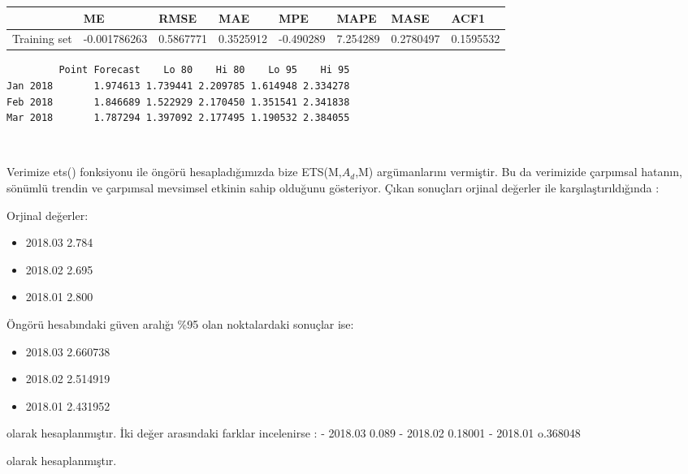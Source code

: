 \documentclass[11pt]{article}
\providecommand{\tightlist}{%
      \setlength{\itemsep}{0pt}\setlength{\parskip}{0pt}}
\begin{document}
    \begin{tabular}{r|lllllll}
  & ME & RMSE & MAE & MPE & MAPE & MASE & ACF1\\
\hline
	Training set & -0.001786263 & 0.5867771    & 0.3525912    & -0.490289    & 7.254289     & 0.2780497    & 0.1595532   \\
\end{tabular}


    
    
    \begin{verbatim}
         Point Forecast    Lo 80    Hi 80    Lo 95    Hi 95
Jan 2018       1.974613 1.739441 2.209785 1.614948 2.334278
Feb 2018       1.846689 1.522929 2.170450 1.351541 2.341838
Mar 2018       1.787294 1.397092 2.177495 1.190532 2.384055
    \end{verbatim}

    
    \begin{center}
    \end{center}
    { \hspace*{\fill} \\}
    
    Verimize ets() fonksiyonu ile öngörü hesapladığımızda bize
ETS(M,\(A_{d}\),M) argümanlarını vermiştir. Bu da verimizide 
çarpımsal hatanın, sönümlü trendin ve çarpımsal mevsimsel etkinin sahip
olduğunu gösteriyor. Çıkan sonuçları orjinal değerler ile
karşılaştırıldığında :

Orjinal değerler:

\begin{itemize}
\tightlist
\item
  2018.03 2.784
\item
  2018.02 2.695
\item
  2018.01 2.800
\end{itemize}

Öngörü hesabındaki güven aralığı \%95 olan noktalardaki sonuçlar ise:

\begin{itemize}
\tightlist
\item
  2018.03 2.660738
\item
  2018.02 2.514919
\item
  2018.01 2.431952
\end{itemize}

olarak hesaplanmıştır. İki değer arasındaki farklar incelenirse : -
2018.03 0.089 - 2018.02 0.18001 - 2018.01 o.368048

olarak hesaplanmıştır.
\end{document}
